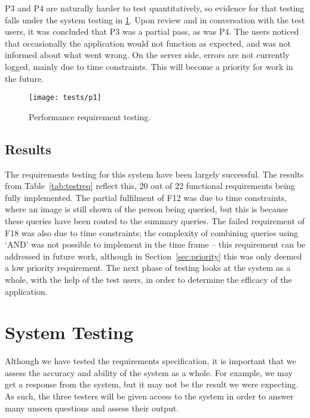 P3 and P4 are naturally harder to test quantitatively, so evidence for that testing falls under the system testing in \ref{sec:systemtesting}. Upon review and in conversation with the test users, it was concluded that P3 was a partial pass, as was P4. The users noticed that occasionally the application would not function as expected, and was not informed about what went wrong. On the server side, errors are not currently logged, mainly due to time constraints. This will become a priority for work in the future.

\begin{figure}[h]
	\begin{center}
		\texttt{[image: tests/p1]}
	\end{center}
	\caption{Performance requirement testing.}
	\label{fig:p1}
\end{figure}

\subsection{Results}
\label{subsec:requirementresults}
The requirements testing for this system have been largely successful. The results from Table~\ref{tab:testreq} reflect this, 20 out of 22 functional requirements being fully implemented. The partial fulfilment of F12 was due to time constraints, where an image is still shown of the person being queried, but this is because these queries have been routed to the summary queries. The failed requirement of F18 was also due to time constraints; the complexity of combining queries using `AND' was not possible to implement in the time frame -- this requirement can be addressed in future work, although in Section~\ref{sec:priority} this was only deemed a low priority requirement. The next phase of testing looks at the system as a whole, with the help of the test users, in order to determine the efficacy of the application.

\section{System Testing}
\label{sec:systemtesting}
Although we have tested the requirements specification, it is important that we assess the accuracy and ability of the system as a whole. For example, we may get a response from the system, but it may not be the result we were expecting. As such, the three testers will be given access to the system in order to answer many unseen questions and assess their output.

